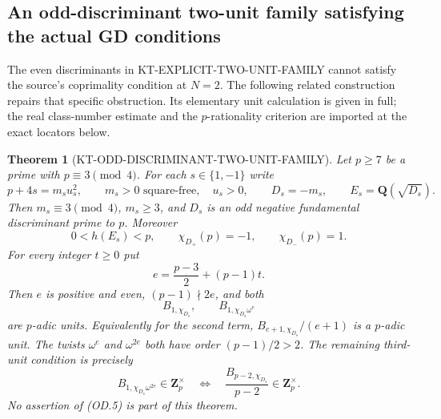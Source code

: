 \documentclass[11pt,a4paper]{article}
\newtheorem{theorem}{Theorem}[section]
\theoremstyle{definition}
\begin{document}


\subsection{An odd-discriminant two-unit family satisfying the actual GD conditions}
\label{sec:kt-odd-discriminant-two-unit}

The even discriminants in KT-EXPLICIT-TWO-UNIT-FAMILY cannot satisfy
the source's coprimality condition at $N=2$.  The following related
construction repairs that specific obstruction.  Its elementary unit
calculation is given in full; the real class-number estimate and the
$p$-rationality criterion are imported at the exact locators below.

\begin{theorem}[KT-ODD-DISCRIMINANT-TWO-UNIT-FAMILY]
Let $p\geq7$ be a prime with $p\equiv3\pmod4$.  For each
$s\in\{1,-1\}$ write
\[
 p+4s=m_su_s^2,\qquad m_s>0\text{ square-free},\quad u_s>0,
 \qquad D_s=-m_s,\qquad E_s=\mathbf Q(\sqrt{D_s}).       \tag{OD.1}
\]
Then $m_s\equiv3\pmod4$, $m_s\geq3$, and $D_s$ is an odd
negative fundamental discriminant prime to $p$.  Moreover
\[
 0<h(E_s)<p,\qquad
 \chi_{D_+}(p)=-1,\qquad \chi_{D_-}(p)=1.                \tag{OD.2}
\]
For every integer $t\geq0$ put
\[
 e=\frac{p-3}{2}+(p-1)t.                                \tag{OD.3}
\]
Then $e$ is positive and even, $(p-1)\nmid2e$, and both
\[
 B_{1,\chi_{D_s}},\qquad B_{1,\chi_{D_s}\omega^e}
                                                            \tag{OD.4}
\]
are $p$-adic units.  Equivalently for the second term,
$B_{e+1,\chi_{D_s}}/(e+1)$ is a $p$-adic unit.
The twists $\omega^e$ and $\omega^{2e}$ both have order
$(p-1)/2>2$.  The remaining third-unit condition is precisely
\[
 B_{1,\chi_{D_s}\omega^{2e}}\in\mathbf Z_p^\times
 \quad\Longleftrightarrow\quad
 \frac{B_{p-2,\chi_{D_s}}}{p-2}\in\mathbf Z_p^\times.     \tag{OD.5}
\]
No assertion of (OD.5) is part of this theorem.
\end{theorem}
\end{document}
